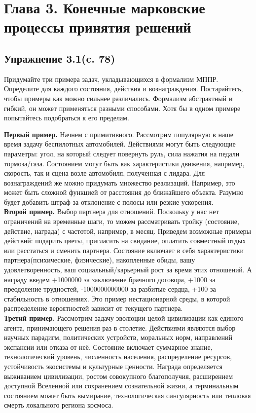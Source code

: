 \section{Глава 3. Конечные марковские процессы принятия решений}
\subsection{Упражнение 3.1(c. 78)}
Придумайте три примера задач, укладывающихся в формализм
МППР. Определите для каждого состояния, действия и  вознаграждения. Постарайтесь, чтобы примеры как можно сильнее различались. Формализм абстрактный и гибкий, он может применяться разными способами. Хотя бы в одном примере попытайтесь подобраться к его пределам.
\begin{solution}
    \textbf{Первый пример.} Начнем с примитивного. Рассмотрим популярную в наше время задачу беспилотных автомобилей. Действиями могут быть следующие параметры: угол, на который следует повернуть руль, сила нажатия на педали тормоза/газа. Состоянием могут быть как характеристики движения, например, скорость, так и сцена возле автомобиля, полученная с лидара. Для вознаграждений же можно придумать множество реализаций. Например, это может быть сложной функцией от расстояния до ближайшего объекта. Разумно будет добавить штраф за отклонение с полосы или резкие ускорения. \\
    \textbf{Второй пример.} Выбор партнера для отношений. Поскольку у нас нет ограничений на временные шаги, то можем рассматривать тройку (состояние, действие, награда) с частотой, например, в месяц. Приведем возможные примеры действий: подарить цветы, пригласить на свидание, оплатить совместный отдых или расстаться и сменить партнера. Состояние включает в себя характеристики партнера(психические, физические), накопленные обиды, вашу удовлетворенность, ваш социальный/карьерный рост за время этих отношений. А награду введем +1000000 за заключение брачного договора, +1000 за преодоление трудностей, -1000000000000 за разбитые сердца, +100 за стабильность в отношениях. Это пример нестационарной среды, в которой распределение вероятностей зависит от текущего партнера.\\
    \textbf{Третий пример.} Рассмотрим задачу эволюции целой цивилизации как единого агента, принимающего решения раз в столетие. Действиями являются выбор научных парадигм, политических устройств, моральных норм, направлений экспансии или отказа от неё. Состояние включает суммарное знание, технологический уровень, численность населения, распределение ресурсов, устойчивость экосистемы и культурные ценности. Награда определяется выживанием цивилизации, ростом совокупного благополучия, расширением доступной Вселенной или сохранением сознательной жизни, а терминальным состоянием может быть вымирание, технологическая сингулярность или тепловая смерть локального региона космоса.
\end{solution}

